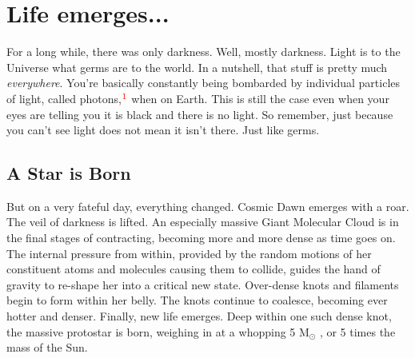 \documentclass[main.tex]{subfiles}
\begin{document}
\chapter{Life emerges...}

\par \nar For a long while, there was only darkness.  Well, mostly darkness.  Light is to the Universe what germs are to the world.  In a nutshell, that stuff is pretty much \textit{everywhere}.  You're basically constantly being bombarded by individual particles of light, called photons,$^{\textcolor{red}{1}}$ when on Earth.  This is still the case even when your eyes are telling you it is black and there is no light.  So remember, just because you can't see light does not mean it isn't there.  Just like germs.


\section{A Star is Born} \label{born}

\par \nar But on a very fateful day, everything changed.  Cosmic Dawn emerges with a roar.  The veil of darkness is lifted.  An especially massive Giant Molecular Cloud is in the final stages of contracting, becoming more and more dense as time goes on.  The internal pressure from within, provided by the random motions of her constituent atoms and molecules causing them to collide, guides the hand of gravity to re-shape her into a critical new state.  Over-dense knots and filaments begin to form within her belly.  The knots continue to coalesce, becoming ever hotter and denser.  Finally, new life emerges.  Deep within one such dense knot, the massive protostar \rmmaia is born, weighing in at a whopping 5 M$_{\odot}$ , or 5 times the mass of the Sun.
\end{document}
